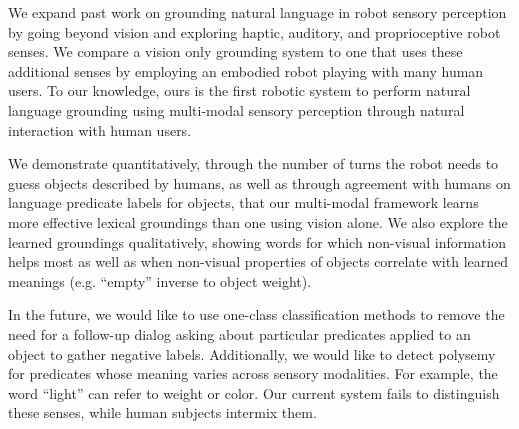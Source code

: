 We expand past work on grounding natural language in robot sensory perception by going beyond vision and exploring haptic, auditory, and proprioceptive robot senses.
We compare a vision only grounding system to one that uses these additional senses by employing an embodied robot playing \ispy with many human users.
To our knowledge, ours is the first robotic system to perform natural language grounding using multi-modal sensory perception through natural interaction with human users.

We demonstrate quantitatively, through the number of turns the robot needs to guess objects described by humans, as well as through agreement with humans on language predicate labels for objects, that our multi-modal framework learns more effective lexical groundings than one using vision alone.
We also explore the learned groundings qualitatively, showing words for which non-visual information helps most as well as when non-visual properties of objects correlate with learned meanings (e.g. ``empty'' inverse to object weight).

In the future, we would like to use one-class classification methods to remove the need for a follow-up dialog asking about particular predicates applied to an object to gather negative labels.
Additionally, we would like to detect polysemy for predicates whose meaning varies across sensory modalities.
For example, the word ``light'' can refer to weight or color.
Our current system fails to distinguish these senses, while human subjects intermix them.
